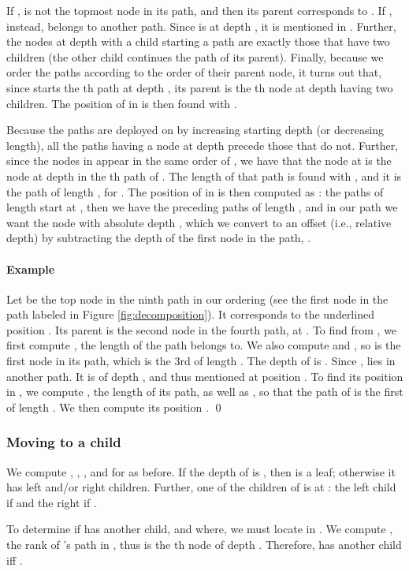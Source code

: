 \documentclass{elsarticle}
\newenvironment{example}{\paragraph{Example}}{\qed \medskip }
\begin{document}
If ,  is not the topmost node in its path, and then its parent  corresponds to . If , instead,  belongs to another path. Since  is at depth , it is mentioned in . Further, the nodes at depth  with a child starting a path are exactly those that have two children (the other child continues the path of its parent). Finally, because we order the paths according to the order of their parent node, it turns out that, since  starts the th path at depth , its parent  is the th node at depth  having two children. The position of  in  is then found with . 

Because the paths are deployed on  by increasing starting depth (or decreasing length), all the paths having a node at depth  precede those that do not. Further, since the nodes in  appear in the same order of , we have that the node at  is the node at depth  in the th path of . The length of that path is found with , and it is the  path of length , for . The position  of  in  is then computed as : the paths of length  start at , then we have the preceding  paths of length , and in our path we want the node with absolute depth , which we convert to an offset (i.e., relative depth) by subtracting the depth of the first node in the path, .



\begin{example}
Let  be the top node in the ninth path in our ordering (see the first node in the path labeled  in Figure \ref{fig:decomposition}). It corresponds to the underlined position . Its parent  is the second node in the fourth path, at . To find  from , we first compute , the length of the path  belongs to. We also compute  and , so  is the first node in its path, which is the 3rd of length . The depth of  is . Since ,  lies in another path. It is of depth , and thus mentioned at position . To find its position in , we compute , the length of its path, as well as , so that the path of  is the first of length . We then compute its position .
\end{example}

\subsubsection{Moving to a child}
We compute , , , and  for  as before.
If the depth  of  is , then  is a leaf; otherwise it has left and/or right children. Further, one of the children of  is at : the left child if  and the right if .

To determine if  has another child, and where, we must locate  in . We compute , the rank of 's path in , thus  is the th node of depth . Therefore,  has another child iff .
\end{document}
